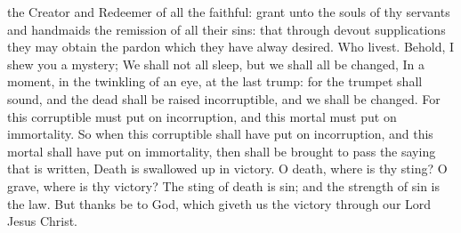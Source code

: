 \collect
{} the Creator and Redeemer of all the faithful: grant unto the souls of thy servants and handmaids the remission of all their sins: that through devout supplications they may obtain the pardon which they have alway desired. Who livest.
 Behold, I shew you a mystery; We shall not all sleep, but we shall all be changed, In a moment, in the twinkling of an eye, at the last trump: for the trumpet shall sound, and the dead shall be raised incorruptible, and we shall be changed. For this corruptible must put on incorruption, and this mortal must put on immortality. So when this corruptible shall have put on incorruption, and this mortal shall have put on immortality, then shall be brought to pass the saying that is written, Death is swallowed up in victory. O death, where is thy sting? O grave, where is thy victory? The sting of death is sin; and the strength of sin is the law. But thanks be to God, which giveth us the victory through our Lord Jesus Christ.
\label{diesirae}
